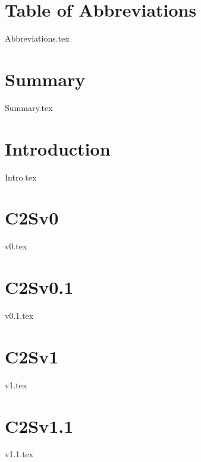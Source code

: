 \documentclass[draft]{article}
\begin{document}
\setlength{\cftsecindent}{0em}          %
\setlength{\cftsubsecindent}{2em}       %
\setlength{\cftsubsubsecindent}{4em}    %
\setlength{\cftsubsubsubsecindent}{6em} %

\setlength{\cftsecnumwidth}{2em}
\setlength{\cftsubsecnumwidth}{3em}
\setlength{\cftsubsubsecnumwidth}{4em}
\setlength{\cftsubsubsubsecnumwidth}{5em}

\tableofcontents

\newpage
\section*{Table of Abbreviations}
    {Abbreviations.tex}

\newpage
\section*{Summary}
    {Summary.tex}

\newpage
\justifying
\clearpage
{}

\section{Introduction}\label{sec:intro}
    {Intro.tex}

\newpage \section{C2Sv0}\label{sec:c2sv0}
    {v0.tex}

\newpage \section{C2Sv0.1}\label{sec:c2sv0.1}
    {v0.1.tex}

\newpage \section{C2Sv1}\label{sec:c2sv1}
    {v1.tex}

\newpage \section{C2Sv1.1}\label{sec:c2sv1.1}
    {v1.1.tex}




\end{document}
